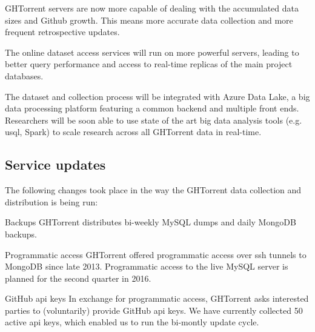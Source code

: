\documentclass{sig-alternate}
\begin{document}
\begin{compactitem}

  \item GHTorrent servers are now more capable of dealing with the accumulated
    data sizes and Github growth. This means more accurate data collection
    and more frequent retrospective updates.

  \item The online dataset access services will run on more powerful servers,
    leading to better query performance and access to real-time replicas of
    the main project databases.

  \item The dataset and collection process will be integrated with Azure
    Data Lake, a big data processing platform featuring a common backend
    and multiple front ends. Researchers will be soon able to use state
    of the art big data analysis tools (e.g. {\sc usql}, Spark) to scale
    research across all GHTorrent data in real-time.

\end{compactitem}


\subsection{Service updates}

The following changes took place in the way the GHTorrent data collection
and distribution is being run:

\begin{compactdesc}

  \item[Backups] GHTorrent distributes bi-weekly MySQL dumps and daily MongoDB
    backups.

  \item[Programmatic access] GHTorrent offered programmatic access over
    {\sc ssh} tunnels to MongoDB since late 2013. Programmatic access to the
    live MySQL server is planned for the second quarter in 2016.

  \item[GitHub {\sc api} keys] In exchange for programmatic access, GHTorrent
    asks interested parties to (voluntarily) provide GitHub {\sc api} keys. We
    have currently collected 50 active {\sc api} keys, which enabled us to run
    the bi-montly update cycle.

\end{compactdesc}

\end{document}
